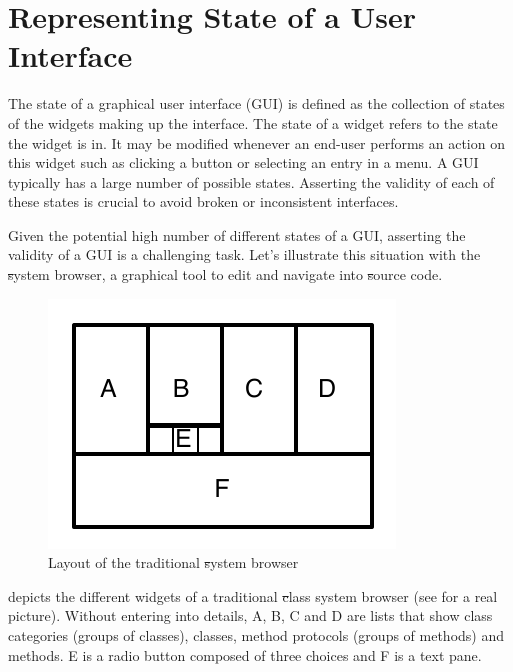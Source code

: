 \documentclass[a4paper,10pt,twoside]{book}
\begin{document}
\section{Representing State of a User Interface} \label{sec:problem}

The state of a graphical user interface (GUI) is defined as the collection of states of the widgets making up the interface. The state of a widget refers to the state the widget is in. It may be modified whenever an end-user performs an action on this widget such as clicking a button or selecting an entry in a menu. A GUI typically has a large number of possible states. Asserting the validity  of each of these states is crucial to avoid broken or inconsistent interfaces.

Given the potential high number of different states of a GUI, asserting the validity of a GUI is a challenging task.  Let's illustrate this situation with the \st system browser, a graphical tool to edit and navigate into \st source code.

\begin{figure}[!ht]
\begin{center}
\includegraphics[scale=0.65]{miniStBrowser}
\caption{Layout of the traditional \st system browser} 
\end{center}
\end{figure}


 depicts the different widgets of a traditional \st class system browser (see  for a real picture). Without entering into details, A, B, C and D are lists that show class categories (groups of classes), classes, method protocols (groups of methods) and methods. E is a radio button composed of three choices and F is a text pane. 
\end{document}
